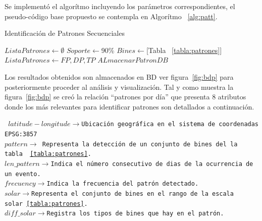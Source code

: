 Se implementó el algorítmo incluyendo los parámetros correspondientes, el pseudo-código base propuesto se contempla en Algorítmo ~\ref{alg:patt}.

\begin{algorithm}
  \renewcommand{\algorithmicrequire}{\textbf{Input:}}
  \renewcommand{\algorithmicensure}{\textbf{Output:}}
  \caption{Identificación de Patrones Secuenciales}
  \label{alg:patt}
  \footnotesize
  \begin{algorithmic}[1]
    \STATE $ListaPatrones \leftarrow \emptyset$
      \STATE $Soporte \leftarrow $90\%
      \STATE $Bines \leftarrow $[Tabla ~\ref{tabla:patrones}]
	\ENDFOR
      \STATE $ListaPatrones \leftarrow FP,DP,TP$ 
      \STATE $ALmacenar Patron DB$ 
    \ENDFOR
  \end{algorithmic}
\end{algorithm}

Los resultados obtenidos son almacenados en BD ver figura~\ref{fig:bdp} para posteriormente proceder al análisis y visualización. Tal y como muestra la figura~\ref{fig:bdp}
se creó la relación ``patrones por día'' que presenta 8 atributos donde los más relevantes para identificar patrones son detallados a continuación.

\texttt{\noindent
\phantom{x}\hspace{5ex}$latitude-longitude\to $\footnotesize Ubicación geográfica en el sistema de coordenadas EPSG:3857 \\
\phantom{x}\hspace{6ex}$pattern\to $ \footnotesize Representa la detección de un conjunto de bines del la tabla ~\ref{tabla:patrones}. \\
\phantom{x}\hspace{6ex}$len\_pattern\to $\footnotesize Indica el número consecutivo de dias de la ocurrencia de un evento.\\
\phantom{x}\hspace{6ex}$frecuency\to $\footnotesize Indica la frecuencia del patrón detectado.\\
\phantom{x}\hspace{6ex}$solar\to $\footnotesize Representa el conjunto de bines en el rango de la escala solar~\ref{tabla:patrones}.\\
\phantom{x}\hspace{6ex}$diff\_solar\to $\footnotesize Registra los tipos de bines que hay en el patrón.\\
}

